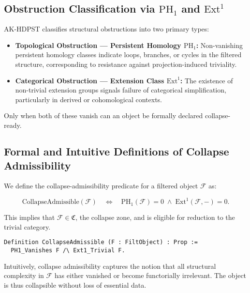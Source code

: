 \documentclass[11pt]{article}
\begin{document}
\subsection{Obstruction Classification via \texorpdfstring{\( \mathrm{PH}_1 \)}{PH₁} and \texorpdfstring{\( \mathrm{Ext}^1 \)}{Ext¹}}

AK-HDPST classifies structural obstructions into two primary types:

\begin{itemize}
  \item \textbf{Topological Obstruction — Persistent Homology \( \mathrm{PH}_1 \):}  
  Non-vanishing persistent homology classes indicate loops, branches, or cycles in the filtered structure, corresponding to resistance against projection-induced triviality.

  \item \textbf{Categorical Obstruction — Extension Class \( \mathrm{Ext}^1 \):}  
  The existence of non-trivial extension groups signals failure of categorical simplification, particularly in derived or cohomological contexts.
\end{itemize}

Only when both of these vanish can an object be formally declared collapse-ready.

\subsection{Formal and Intuitive Definitions of Collapse Admissibility}

We define the collapse-admissibility predicate for a filtered object \( \mathcal{F} \) as:

\[
\text{CollapseAdmissible}(\mathcal{F}) \quad \Longleftrightarrow \quad \mathrm{PH}_1(\mathcal{F}) = 0 \;\wedge\; \mathrm{Ext}^1(\mathcal{F}, -) = 0.
\]

This implies that \( \mathcal{F} \in \mathfrak{C} \), the collapse zone, and is eligible for reduction to the trivial category.

\begin{lstlisting}[language=Coq]
Definition CollapseAdmissible (F : FiltObject) : Prop :=
  PH1_Vanishes F /\ Ext1_Trivial F.
\end{lstlisting}

Intuitively, collapse admissibility captures the notion that all structural complexity in \( \mathcal{F} \) has either vanished or become functorially irrelevant. The object is thus collapsible without loss of essential data.
\end{document}

